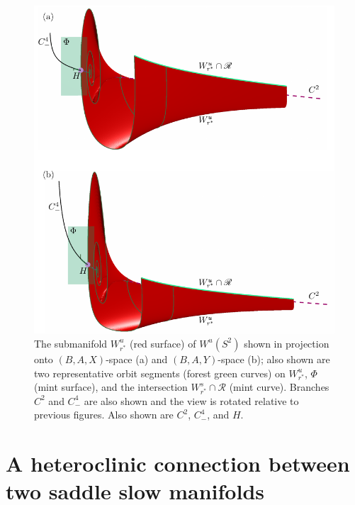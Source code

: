 \documentclass{ws-ijbc}
\begin{document}
\begin{figure}[H]
\centering
\includegraphics[]{./figures/MKMO_7.pdf}
\caption{The submanifold $W^u_{r^*}$ (red surface) of $W^u(S^2)$ shown in projection onto $(B,A,X)$-space (a) and $(B,A,Y)$-space (b); also shown are two representative orbit segments (forest green curves) on $W^u_{r^*}$, $\Phi$ (mint surface), and the intersection $W^s_{r^*}\cap\mathscr{R}$ (mint curve).  Branches $C^2$ and $C^4_-$ are also shown and the view is rotated relative to previous figures.  Also shown are $C^2$, $C^4_-$, and $H$.}
\label{figure_7}
\end{figure}



\section{A heteroclinic connection between two saddle slow manifolds}
\end{document}
